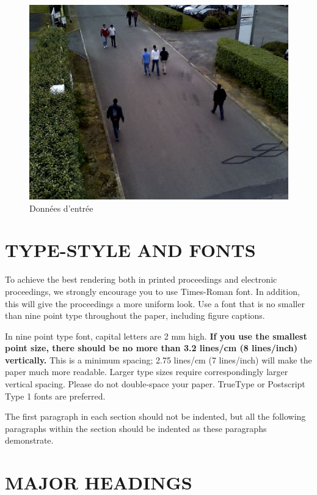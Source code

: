 \documentclass{article}
\begin{document}
	\begin{figure}
		\begin{center}			
			\includegraphics[scale=0.3]{Img/detection_0156}
		\end{center}
		\caption{Données d'entrée}
	\end{figure}

\section{TYPE-STYLE AND FONTS}
\label{sec:typestyle}

To achieve the best rendering both in printed proceedings and electronic proceedings, we
strongly encourage you to use Times-Roman font.  In addition, this will give
the proceedings a more uniform look.  Use a font that is no smaller than nine
point type throughout the paper, including figure captions.

In nine point type font, capital letters are 2 mm high.  {\bf If you use the
smallest point size, there should be no more than 3.2 lines/cm (8 lines/inch)
vertically.}  This is a minimum spacing; 2.75 lines/cm (7 lines/inch) will make
the paper much more readable.  Larger type sizes require correspondingly larger
vertical spacing.  Please do not double-space your paper.  TrueType or
Postscript Type 1 fonts are preferred.

The first paragraph in each section should not be indented, but all the
following paragraphs within the section should be indented as these paragraphs
demonstrate.

\section{MAJOR HEADINGS}
\label{sec:majhead}
\end{document}
